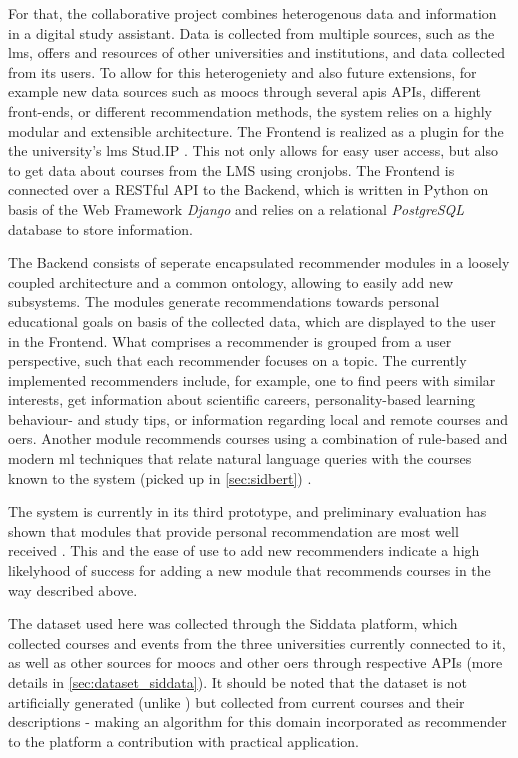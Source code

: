 For that, the collaborative project combines heterogenous data and information in a digital study assistant. Data is collected from multiple sources, such as the \gls{lms}, offers and resources of other universities and institutions, and data collected from its users. To allow for this heterogeniety and also future extensions, for example new data sources  such as \glspl{mooc} through several apis APIs, different front-ends, or different recommendation methods, the system relies on a highly modular and extensible architecture. The Frontend is realized as a plugin for the  the university's \gls{lms} Stud.IP \cite{stockmann2005}. This not only allows for easy user access, but also to get data about courses from the LMS using cronjobs. The Frontend is connected over a RESTful API to the Backend, which is written in Python on basis of the Web Framework \textit{Django} and relies on a relational \textit{PostgreSQL} database to store information.

The Backend consists of seperate encapsulated recommender modules in a loosely coupled architecture and a common ontology, allowing to easily add new subsystems. The modules generate recommendations towards personal educational goals on basis of the collected data, which are displayed to the user in the Frontend. What comprises a recommender is grouped from a user perspective, such that each recommender focuses on a topic. The currently implemented recommenders include, for example, one to find peers with similar interests, get information about scientific careers, personality-based learning behaviour- and study tips, or information regarding local and remote courses and \glspl{oer}. Another module recommends courses using a combination of rule-based and modern \gls{ml} techniques that relate natural language queries with the courses known to the system (picked up in \autoref{sec:sidbert}) \cite{Schurz2021}.

The system is currently in its third prototype, and preliminary evaluation has shown that modules that provide personal recommendation are most well received \cite{Schurz2021}. This and the ease of use to add new recommenders indicate a high likelyhood of success for adding a new module that recommends courses in the way described above.

The dataset used here was collected through the Siddata platform, which collected courses and events from the three universities currently connected to it, as well as other sources for \glspl{mooc} and other \glspl{oer} through respective APIs (more details in \autoref{sec:dataset_siddata}). It should be noted that the dataset is not artificially generated (unlike \mainalgos) but collected from current courses and their descriptions - making an algorithm for this domain incorporated as recommender to the platform a contribution with practical application.



